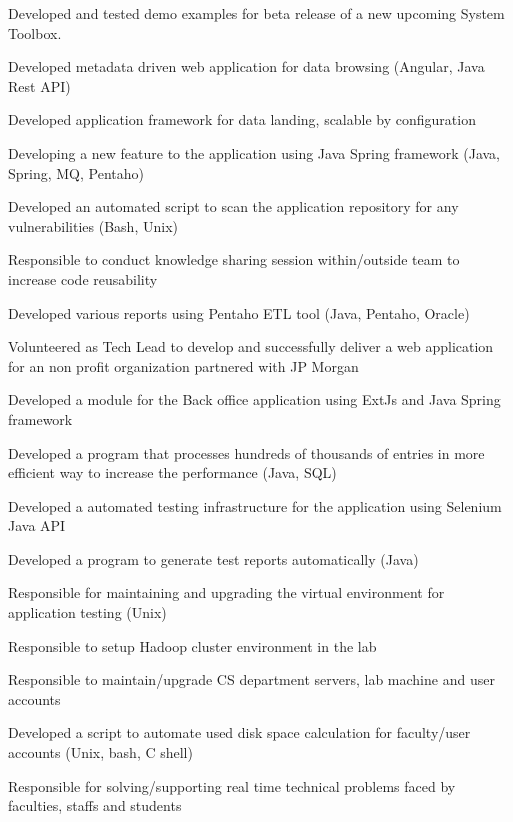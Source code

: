 \documentclass[]{main}
\begin{document}
\begin{minipage}[t]{0.73\textwidth}
\begin{tightemize}
\item Developed and tested demo examples for beta release of a new upcoming System Toolbox. 
\item Developed metadata driven web application for data browsing (Angular, Java Rest API)
\item Developed application framework for data landing, scalable by configuration
\item Developing a new feature to the application using Java Spring framework (Java, Spring, MQ, Pentaho)
\item Developed an automated script to scan the application repository for any vulnerabilities (Bash, Unix)
\item Responsible to conduct knowledge sharing session within/outside team to increase code reusability
\item Developed various reports using Pentaho ETL tool (Java, Pentaho, Oracle)
\item Volunteered as Tech Lead to develop and successfully deliver a web application for an non profit organization
partnered with JP Morgan
\end{tightemize}
\sectionsep

\begin{tightemize}
\item Developed a module for the Back office application using ExtJs and Java Spring framework
\item Developed a program that processes hundreds of thousands of entries in more efficient way to increase the performance (Java, SQL)
\item Developed a automated testing infrastructure for the application using Selenium Java API
\item Developed a program to generate test reports automatically (Java)
\item Responsible for maintaining and upgrading the virtual environment for application testing (Unix)
\end{tightemize}
\sectionsep

\begin{tightemize}
\item Responsible to setup Hadoop cluster environment in the lab
\item Responsible to maintain/upgrade CS department servers, lab machine and user accounts
\item Developed a script to automate used disk space calculation for faculty/user accounts (Unix, bash, C shell)
\item Responsible for solving/supporting real time technical problems faced by faculties, staffs and students
\end{tightemize}
\sectionsep


\end{minipage}
\end{document}
